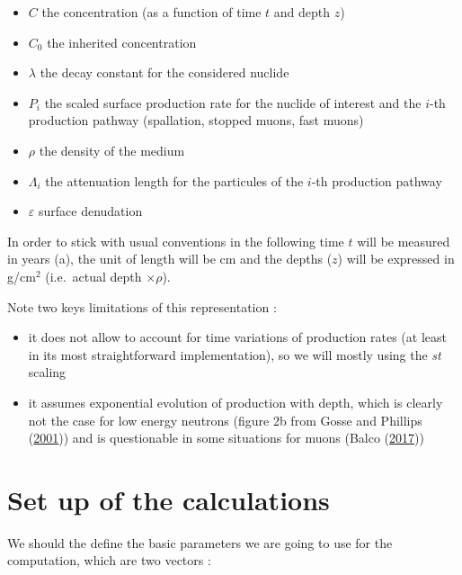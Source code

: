 \documentclass[
]{book}
\providecommand{\tightlist}{%
  \setlength{\itemsep}{0pt}\setlength{\parskip}{0pt}}
\begin{document}
\begin{itemize}
\tightlist
\item
  \(C\) the concentration (as a function of time \(t\) and depth \(z\))
\item
  \(C_0\) the inherited concentration
\item
  \(\lambda\) the decay constant for the considered nuclide
\item
  \(P_i\) the scaled surface production rate for the nuclide of interest and the \(i\)-th production pathway (spallation, stopped muons, fast muons)
\item
  \(\rho\) the density of the medium
\item
  \(\Lambda_i\) the attenuation length for the particules of the \(i\)-th production pathway
\item
  \(\varepsilon\) surface denudation
\end{itemize}

In order to stick with usual conventions in the following time \(t\) will be measured in years (a), the unit of length will be cm and the depths (\(z\)) will be expressed in g/cm\(^2\) (i.e.~actual depth \(\times \rho\)).

Note two keys limitations of this representation :

\begin{itemize}
\tightlist
\item
  it does not allow to account for time variations of production rates (at least in its most straightforward implementation), so we will mostly using the \emph{st} scaling
\item
  it assumes exponential evolution of production with depth, which is clearly not the case for low energy neutrons (figure 2b from Gosse and Phillips (\protect\hyperlink{ref-gosse2001terrestrial}{2001})) and is questionable in some situations for muons (Balco (\protect\hyperlink{ref-balco2017production}{2017}))
\end{itemize}

\hypertarget{set-up-of-the-calculations}{%
\section{Set up of the calculations}\label{set-up-of-the-calculations}}

We should the define the basic parameters we are going to use for the computation, which are two vectors :
\end{document}
